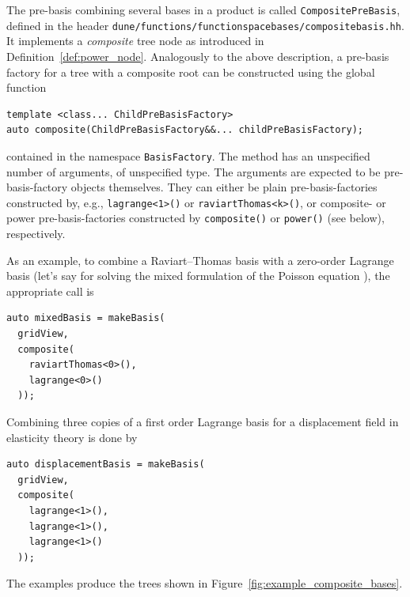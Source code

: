 \documentclass[a4paper,10pt,headings=normal,bibliography=totoc]{scrartcl}
\newcommand{\cpp}[1]{\lstinline[basicstyle=\ttfamily]!#1!}
\newcommand{\file}[1]{\texttt{#1}}
\begin{document}
The pre-basis combining several bases in a product is called \cpp{CompositePreBasis},
defined in the header \file{dune/functions/functionspacebases/compositebasis.hh}.
It implements a \emph{composite} tree node as introduced in Definition~\ref{def:power_node}.
Analogously to the above description, a pre-basis factory for a tree with a composite root
can be constructed using the global function
\begin{lstlisting}[style=Interface]
template <class... ChildPreBasisFactory>
auto composite(ChildPreBasisFactory&&... childPreBasisFactory);
\end{lstlisting}
contained in the namespace \cpp{BasisFactory}.
The method has an unspecified number of arguments, of unspecified type.
The arguments are expected to be pre-basis-factory objects themselves.
They can either be plain pre-basis-factories constructed by, e.g.,
\cpp{lagrange<1>()} or \cpp{raviartThomas<k>()},
or composite- or power pre-basis-factories constructed by \cpp{composite()}
or \cpp{power()} (see below), respectively.

As an example, to combine a Raviart--Thomas basis with a zero-order Lagrange basis
(let's say for solving
the mixed formulation of the Poisson equation \cite{braess:2013}), the appropriate call is
\begin{lstlisting}[style=Example]
auto mixedBasis = makeBasis(
  gridView,
  composite(
    raviartThomas<0>(),
    lagrange<0>()
  ));
\end{lstlisting}
Combining three copies of a first order Lagrange basis for a displacement field in elasticity theory is
done by
\begin{lstlisting}[style=Example]
auto displacementBasis = makeBasis(
  gridView,
  composite(
    lagrange<1>(),
    lagrange<1>(),
    lagrange<1>()
  ));
\end{lstlisting}
The examples produce the trees shown in Figure~\ref{fig:example_composite_bases}.
\end{document}
